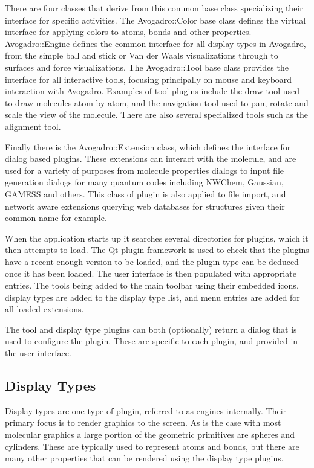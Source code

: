 \documentclass[10pt]{bmc_article}
\newenvironment{bmcformat}{\begin{raggedright}
\baselineskip20pt\sloppy\setboolean{publ}{false}}{\end{raggedright}
\baselineskip20pt\sloppy}
\begin{document}
\begin{bmcformat}
There are four classes that derive from this common base class specializing
their interface for specific activities. The Avogadro::Color base class defines
the virtual interface for applying colors to atoms, bonds and other properties.
Avogadro::Engine defines the common interface for all display types in Avogadro,
from the simple ball and stick or Van der Waals visualizations through to
surfaces and force visualizations. The Avogadro::Tool base class provides
the interface for all interactive tools, focusing principally on mouse and
keyboard interaction with Avogadro. Examples of tool plugins include the draw
tool used to draw molecules atom by atom, and the navigation tool used to pan,
rotate and scale the view of the molecule. There are also several specialized
tools such as the alignment tool.

Finally there is the Avogadro::Extension class, which defines the interface for
dialog based plugins. These extensions can interact with the molecule, and are
used for a variety of purposes from molecule properties dialogs to input file
generation dialogs for many quantum codes including NWChem, Gaussian, GAMESS and
others. This class of plugin is also applied to file import, and network aware
extensions querying web databases for structures given their common name for
example.

When the application starts up it searches several directories for plugins,
which it then attempts to load. The Qt plugin framework is used to check that
the plugins have a recent enough version to be loaded, and the plugin type can
be deduced once it has been loaded. The user interface is then populated with
appropriate entries. The tools being added to the main toolbar using their
embedded icons, display types are added to the display type list, and menu
entries are added for all loaded extensions.

The tool and display type plugins can both (optionally) return a dialog that is
used to configure the plugin. These are specific to each plugin, and provided in
the user interface.

\subsection{Display Types}

Display types are one type of plugin, referred to as engines internally. Their
primary focus is to render graphics to the screen. As is the case with most
molecular graphics a large portion of the geometric primitives are spheres and
cylinders. These are typically used to represent atoms and bonds, but there are
many other properties that can be rendered using the display type plugins.


\end{bmcformat}
\end{document}
